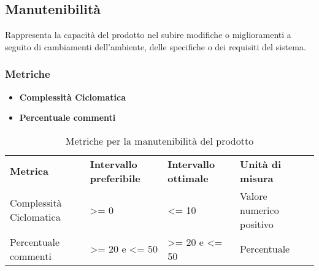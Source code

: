 \subsection{Manutenibilità}
Rappresenta la capacità del prodotto nel subire modifiche o miglioramenti a seguito di cambiamenti dell'ambiente, delle specifiche o dei requisiti del sistema.
\subsubsection{Metriche}
\begin{itemize}
	\item \textbf{Complessità Ciclomatica}
	\item \textbf{Percentuale commenti}
\end{itemize}

\renewcommand{\arraystretch}{2.2}
\begin{longtable}{|C{3cm}|C{3cm}|C{3cm}|C{3cm}|}

	\caption{Metriche per la manutenibilità del prodotto}\\
	\hline

	\textbf{Metrica} & \textbf{Intervallo preferibile}  & \textbf{Intervallo ottimale} & \textbf{Unità di misura}
	\tabularnewline
	\endfirsthead

	Complessità Ciclomatica &  >= 0 & <= 10 & Valore numerico positivo \\
	Percentuale commenti &  >= 20 e <= 50 & >= 20 e <= 50 & Percentuale \\
\end{longtable}
